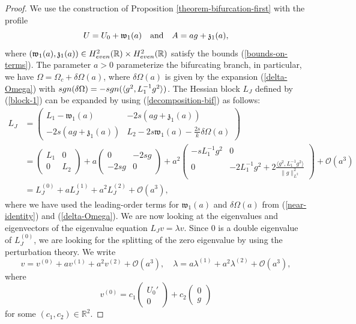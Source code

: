 \documentclass[10pt,a4paper]{amsart}
\begin{document}
\begin{proof}
We use the construction of Proposition \ref{theorem-bifurcation-first} with the profile 
\begin{equation}
\label{decomposition-bif}
U = U_0 + \mathfrak{w}_1(a) \quad  \mbox{\rm and} \quad 
A = a g + \mathfrak{z}_1(a),
\end{equation}
where $(\mathfrak{w}_1(a), \mathfrak{z}_1(a)) \in H^2_{\rm even}(\mathbb{R}) \times H^2_{\rm even}(\mathbb{R})$ satisfy the bounds (\ref{bounds-on-terms}). The parameter $a > 0$ parameterize the bifurcating branch, 
in particular, we have $\Omega = \Omega_c + \delta \Omega(a)$, where $\delta \Omega(a)$ is given by the expansion 
(\ref{delta-Omega}) with ${\rm sgn}(\delta \Omega) = -{\rm sgn}(\langle g^2, L_1^{-1} g^2 \rangle)$. 
The Hessian block $L_J$ defined by (\ref{block-1}) can be expanded by using (\ref{decomposition-bif}) as follows:
\begin{align*}
    L_J &= \begin{pmatrix} L_1 - \mathfrak{w}_1(a) & -2 s (a g + \mathfrak{z}_1(a))  \\ 
-2 s (a g + \mathfrak{z}_1(a)) & L_2 - 2 s \mathfrak{w}_1(a) -\frac{2 s}{k} \delta\Omega(a)
\end{pmatrix} \\
&= \begin{pmatrix} L_1 & 0  \\ 
0 & L_2 \end{pmatrix} 
+ a \begin{pmatrix} 0 & -2 s g \\ 
-2 s g & 0 \end{pmatrix} 
+ a^2 \begin{pmatrix} - s L_{1}^{-1} g^2 & 0 \\ 
0 & -2 L_{1}^{-1}g^2+  2\frac{\langle g^2, L_1^{-1} g^2 \rangle}{\| g \|^2_{L^2}}  
\end{pmatrix} + \mathcal{O}(a^3) \\
&= L_J^{(0)} + a L_J^{(1)} + a^2 L_J^{(2)} + \mathcal{O}(a^3),
\end{align*}
where we have used the leading-order terms for $\mathfrak{w}_1(a)$ and $\delta \Omega(a)$ from (\ref{near-identity}) and (\ref{delta-Omega}).
We are now looking at the eigenvalues and eigenvectors of the eigenvalue equation $L_J v = \lambda v$. 
Since $0$ is a double eigenvalue of $L_J^{(0)}$, we are looking for the splitting of the zero eigenvalue 
by using the perturbation theory. We write 
$$
v = v^{(0)} + a v^{(1)} + a^2 v^{(2)} + \mathcal{O}(a^3), \quad \lambda = a \lambda^{(1)} + a^2 \lambda^{(2)} + \mathcal{O}(a^3),
$$
where
$$
v^{(0)} = c_1 \begin{pmatrix} U_0'\\0\end{pmatrix} + c_2\begin{pmatrix}0\\g\end{pmatrix}
$$
for some $(c_1,c_2) \in \mathbb{R}^2$. 



\end{proof}
\end{document}
